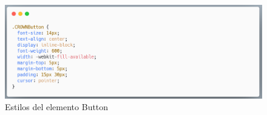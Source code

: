 \newline
\begin{figure}[H]
    \includegraphics[width=1\textwidth]{./Imagenes/image26.png}
    \caption[Estilos del elemento Button]{Estilos del elemento Button}
    \end{figure}
\newline
\newline
\clearpage


